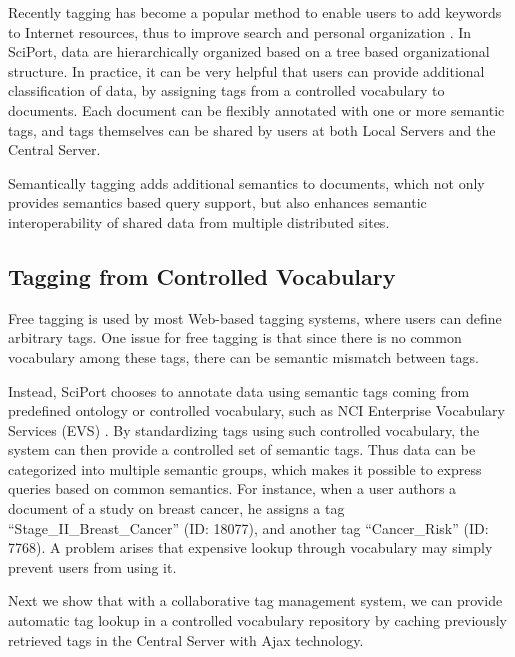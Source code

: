 \documentclass{doublecol-new}
\theoremstyle{TH}{
\newtheorem{lemma}{Lemma}
\newtheorem{theorem}[lemma]{Theorem}
\newtheorem{corrolary}[lemma]{Corrolary}
\newtheorem{conjecture}[lemma]{Conjecture}
\newtheorem{proposition}[lemma]{Proposition}
\newtheorem{claim}[lemma]{Claim}
\newtheorem{stheorem}[lemma]{Wrong Theorem}
\newtheorem{algorithm}{Algorithm}
}
\theoremstyle{THrm}{
\newtheorem{definition}{Definition}[section]
\newtheorem{question}{Question}[section]
\newtheorem{remark}{Remark}
\newtheorem{scheme}{Scheme}
}
\theoremstyle{THhit}{
\newtheorem{case}{Case}[section]
}
\begin{document}
Recently tagging has become a popular method to enable users to add
keywords to Internet resources, thus to improve search and personal
organization \cite{marlow06tag}. In SciPort, data are hierarchically
organized based on a tree based organizational structure. In
practice, it can be very helpful that users can provide additional
classification of data, by assigning tags from a controlled
vocabulary to documents. Each document can be flexibly annotated
with one or more semantic tags, and tags themselves can be shared by
users at both Local Servers and the Central Server.

Semantically tagging adds additional semantics to documents, which
not only provides semantics based query support, but also enhances
semantic interoperability of shared data from multiple distributed
sites.


\subsection{Tagging from Controlled Vocabulary}

Free tagging is used by most Web-based tagging systems, where users
can define arbitrary tags. One issue for free tagging is that since
there is no common vocabulary among these tags, there can be
semantic mismatch between tags.

Instead, SciPort chooses to annotate data using semantic tags coming
from predefined ontology or controlled vocabulary, such as NCI
Enterprise Vocabulary Services (EVS) \cite{ncievs}. By standardizing
tags using such controlled vocabulary, the system can then provide a
controlled  set of semantic tags. Thus data can be categorized into
multiple semantic groups, which makes it possible to express queries
based on common semantics. For instance, when a user authors a
document of a study on breast cancer,  he assigns  a tag
``Stage\_II\_Breast\_Cancer'' (ID: 18077), and another tag
``Cancer\_Risk'' (ID: 7768). A problem arises that expensive lookup
through vocabulary may simply prevent users from using it.

Next we show that with a collaborative tag management system, we can
provide automatic tag lookup in a controlled vocabulary repository
by caching previously retrieved tags in the Central Server with Ajax
technology.


\end{document}
